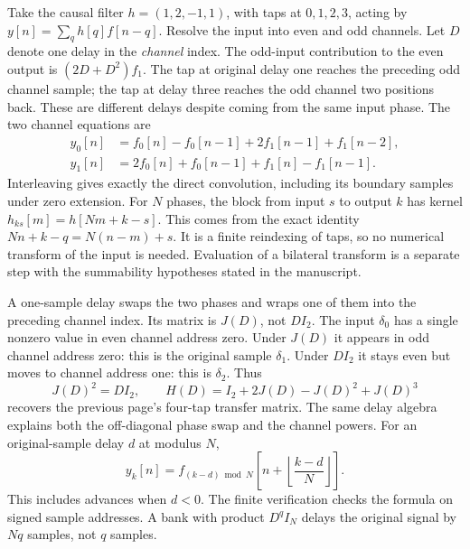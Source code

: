 Take the causal filter $h=(1,2,-1,1)$, with taps at $0,1,2,3$, acting by $y[n]=\sum_qh[q]f[n-q]$. Resolve the input into even and odd channels. Let $D$ denote one delay in the \emph{channel} index.
The odd-input contribution to the even output is $(2D+D^2)f_1$. The tap at original delay one reaches the preceding odd channel sample; the tap at delay three reaches the odd channel two positions back. These are different delays despite coming from the same input phase.
The two channel equations are
\[
\begin{aligned}
y_0[n]&=f_0[n]-f_0[n-1]+2f_1[n-1]+f_1[n-2],\\
y_1[n]&=2f_0[n]+f_0[n-1]+f_1[n]-f_1[n-1].
\end{aligned}
\]
Interleaving gives exactly the direct convolution, including its boundary samples under zero extension.
For $N$ phases, the block from input $s$ to output $k$ has kernel
$h_{ks}[m]=h[Nm+k-s]$. This comes from the exact identity
$Nn+k-q=N(n-m)+s$. It is a finite reindexing of taps, so no numerical transform of the input is needed. Evaluation of a bilateral transform is a separate step with the summability hypotheses stated in the manuscript.

A one-sample delay swaps the two phases and wraps one of them into the preceding channel index. Its matrix is $J(D)$, not $DI_2$.
The input $\delta_0$ has a single nonzero value in even channel address zero. Under $J(D)$ it appears in odd channel address zero: this is the original sample $\delta_1$. Under $DI_2$ it stays even but moves to channel address one: this is $\delta_2$.
Thus
\[
J(D)^2=DI_2,
\qquad
H(D)=I_2+2J(D)-J(D)^2+J(D)^3
\]
recovers the previous page's four-tap transfer matrix. The same delay algebra explains both the off-diagonal phase swap and the channel powers.
For an original-sample delay $d$ at modulus $N$,
\[
y_k[n]=f_{(k-d)\bmod N}
\!\left[n+\left\lfloor\frac{k-d}{N}\right\rfloor\right].
\]
This includes advances when $d<0$. The finite verification checks the formula on signed sample addresses. A bank with product $D^qI_N$ delays the original signal by $Nq$ samples, not $q$ samples.

